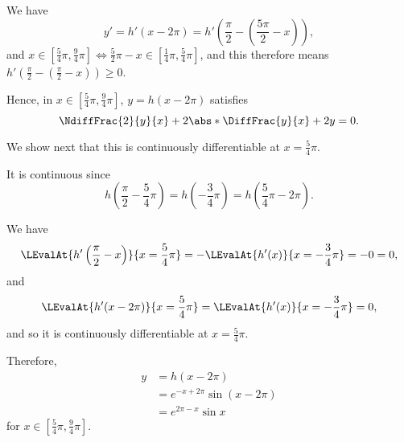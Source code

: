 \begin{enumerate}
\begin{enumerate}
                    We have
                    \[
                        y' = h'(x - 2\pi) = h' \left(\frac{\pi}{2} - \left(\frac{5\pi}{2} - x\right)\right),
                    \]
                    and \(x \in \left[\frac{5}{4}\pi, \frac{9}{4}\pi\right] \iff \frac{5}{2}\pi - x \in \left[\frac{1}{4}\pi, \frac{5}{4}\pi\right]\), and this therefore means \(h' \left(\frac{\pi}{2} - \left(\frac{\pi}{2} - x\right) \right) \geq 0\).

                    Hence, in \(x \in \left[\frac{5}{4}\pi, \frac{9}{4}\pi\right]\), \(y = h(x - 2\pi)\) satisfies
                    \[
                        \NdiffFrac{2}{y}{x} + 2 \abs*{\DiffFrac{y}{x}} + 2y = 0.
                    \]

                    We show next that this is continuously differentiable at \(x = \frac{5}{4}\pi\).

                    It is continuous since
                    \[
                        h \left(\frac{\pi}{2} - \frac{5}{4}\pi\right) = h \left(- \frac{3}{4}\pi\right) = h \left(\frac{5}{4}\pi - 2\pi\right).
                    \]

                    We have
                    \[
                        \LEvalAt{h'\left(\frac{\pi}{2} - x\right)}{x = \frac{5}{4} \pi} = - \LEvalAt{h'(x)}{x = - \frac{3}{4} \pi} = -0 = 0,
                    \]
                    and
                    \[
                        \LEvalAt{h'(x - 2\pi)}{x = \frac{5}{4}\pi} = \LEvalAt{h'(x)}{x = -\frac{3}{4}\pi} = 0,
                    \]
                    and so it is continuously differentiable at \(x = \frac{5}{4}\pi\).

                    Therefore,
                    \begin{align*}
                        y & = h (x - 2\pi)                             \\
                          & = e^{-x + 2\pi} \sin \left(x - 2\pi\right) \\
                          & = e^{2\pi - x} \sin x
                    \end{align*}
                    for \(x \in \left[\frac{5}{4}\pi, \frac{9}{4}\pi\right]\).
          \end{enumerate}
\end{enumerate}